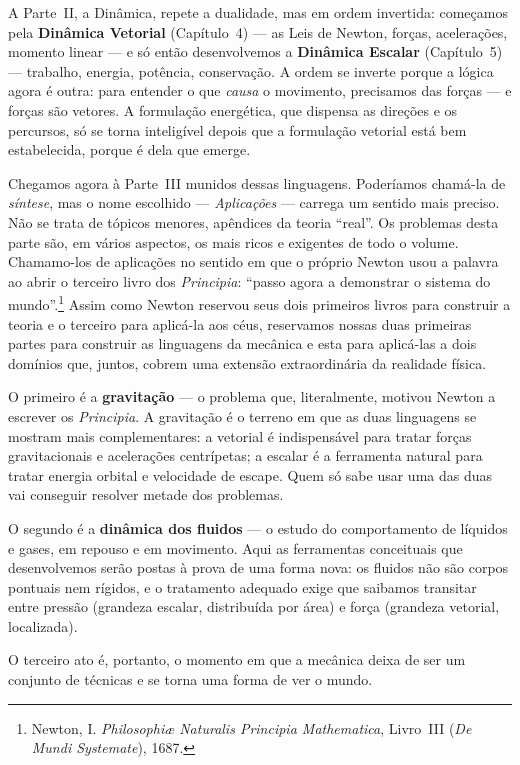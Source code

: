 A Parte~II, a Dinâmica, repete a dualidade, mas em ordem
invertida: começamos pela \textbf{Dinâmica Vetorial} (Capítulo~4)
--- as Leis de Newton, forças, acelerações, momento linear --- e
só então desenvolvemos a \textbf{Dinâmica Escalar} (Capítulo~5)
--- trabalho, energia, potência, conservação. A ordem se inverte
porque a lógica agora é outra: para entender o que \emph{causa} o
movimento, precisamos das forças --- e forças são vetores. A
formulação energética, que dispensa as direções e os percursos,
só se torna inteligível depois que a formulação vetorial está bem
estabelecida, porque é dela que emerge.
 

 
 
 
Chegamos agora à Parte~III munidos dessas linguagens. Poderíamos
chamá-la de \emph{síntese}, mas o nome escolhido ---
\emph{Aplicações} --- carrega um sentido mais preciso. Não se trata
de tópicos menores, apêndices da teoria ``real''. Os problemas
desta parte são, em vários aspectos, os mais ricos e exigentes de
todo o volume. Chamamo-los de aplicações no sentido em que o
próprio Newton usou a palavra ao abrir o terceiro livro dos
\emph{Principia}: ``passo agora a demonstrar o sistema do
mundo''.\footnote{Newton, I. \textit{Philosophiæ Naturalis
Principia Mathematica}, Livro~III (\textit{De Mundi Systemate}),
1687.} Assim como Newton reservou seus dois primeiros livros para
construir a teoria e o terceiro para aplicá-la aos céus,
reservamos nossas duas primeiras partes para construir as linguagens
da mecânica e esta para aplicá-las a dois domínios que, juntos,
cobrem uma extensão extraordinária da realidade física.
 
O primeiro é a \textbf{gravitação} --- o problema que, literalmente,
motivou Newton a escrever os \emph{Principia}. A gravitação é o
terreno em que as duas linguagens se mostram mais complementares:
a vetorial é indispensável para tratar forças gravitacionais e
acelerações centrípetas; a escalar é a ferramenta natural para
tratar energia orbital e velocidade de escape. Quem só sabe usar
uma das duas vai conseguir resolver metade dos problemas.
 
O segundo é a \textbf{dinâmica dos fluidos} --- o estudo do
comportamento de líquidos e gases, em repouso e em movimento.
Aqui as ferramentas conceituais que desenvolvemos serão postas à
prova de uma forma nova: os fluidos não são corpos pontuais nem
rígidos, e o tratamento adequado exige que saibamos transitar entre
pressão (grandeza escalar, distribuída por área) e força (grandeza
vetorial, localizada).
 
O terceiro ato é, portanto, o momento em que a mecânica deixa de ser
um conjunto de técnicas e se torna uma forma de ver o mundo.
